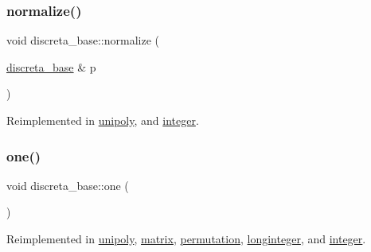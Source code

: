 \mbox{\label{classdiscreta__base_acd46a488505c6086b5bc019550e5e313}} 
\subsubsection{\texorpdfstring{normalize()}{normalize()}}
{\footnotesize\ttfamily void discreta\+\_\+base\+::normalize (\begin{DoxyParamCaption}\item[{\mbox{\hyperlink{classdiscreta__base}{discreta\+\_\+base}} \&}]{p }\end{DoxyParamCaption})\hspace{0.3cm}{\ttfamily [virtual]}}



Reimplemented in \mbox{\hyperlink{classunipoly_a1fdf6f2da235edcf45fca433dea19370}{unipoly}}, and \mbox{\hyperlink{classinteger_aac4272bbf32a3e1b4a5201630f116388}{integer}}.

\mbox{\label{classdiscreta__base_a6f5d6422a0040950415db30e39dafd19}} 
\subsubsection{\texorpdfstring{one()}{one()}}
{\footnotesize\ttfamily void discreta\+\_\+base\+::one (\begin{DoxyParamCaption}{ }\end{DoxyParamCaption})\hspace{0.3cm}{\ttfamily [virtual]}}



Reimplemented in \mbox{\hyperlink{classunipoly_a12db8572d9d5a2edba5b7a4562f6e746}{unipoly}}, \mbox{\hyperlink{classmatrix_a780b461503be22827c4fdca66f779be1}{matrix}}, \mbox{\hyperlink{classpermutation_a358377181aea843bd774f0dfb3822b7f}{permutation}}, \mbox{\hyperlink{classlonginteger_ae1b9507b0d658768ceb278659e2adf1a}{longinteger}}, and \mbox{\hyperlink{classinteger_a18a967d90d63b1c58e3f2480e9084ed5}{integer}}.

\mbox{\label{classdiscreta__base_aa42f42d6b940b80fbf451b10620e99ac}} 
